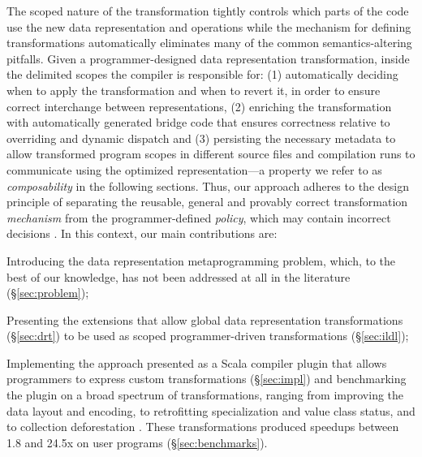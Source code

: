 The scoped nature of the transformation tightly controls which
parts of the code use the new data representation and operations while
the mechanism for defining transformations automatically eliminates
many of the common semantics-altering pitfalls.
Given a programmer-designed data representation transformation,
inside the delimited scopes the compiler is responsible for:
(1) automatically deciding when to apply the transformation and when to revert it, in
order to ensure correct interchange between representations, (2)
enriching the transformation with automatically generated bridge code
that ensures correctness relative to overriding and dynamic dispatch
and (3) persisting the necessary metadata to allow transformed program
scopes in different source files and compilation runs to communicate
using the optimized representation---a property we refer to as
\emph{composability} in the following sections. Thus, our approach
adheres to the design principle of separating the reusable, general
and provably correct transformation \emph{mechanism} from the programmer-defined
\emph{policy}, which may contain incorrect decisions
\cite{lampson-mechanism-policy}. In this context, our main contributions are:
\vspace{0.25em}
\begin{compactitem}
  \item Introducing the data representation metaprogramming problem, which, to the best of our knowledge, has not been addressed at all in the literature (\S\ref{sec:problem});
  \item Presenting the extensions that allow global data representation transformations (\S\ref{sec:drt}) to be used as scoped programmer-driven transformations (\S\ref{sec:ildl});
  \item Implementing the approach presented as a Scala compiler plugin \cite{ildl-plugin} that allows programmers to express custom transformations (\S\ref{sec:impl}) and benchmarking the plugin on a broad spectrum of transformations, ranging from improving the data layout and encoding, to retrofitting specialization and value class status, and to collection deforestation \cite{wadler-deforestation}. These transformations produced  speedups between 1.8 and 24.5x on user programs (\S\ref{sec:benchmarks}).
\end{compactitem}

